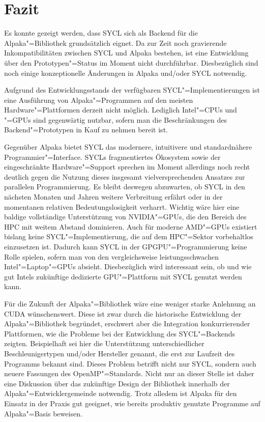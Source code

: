 \chapter{Fazit}
\label{fazit}

Es konnte gezeigt werden, dass SYCL sich als Backend für die Alpaka"=Bibliothek
grundsätzlich eignet. Da zur Zeit noch gravierende Inkompatibilitäten zwischen
SYCL und Alpaka bestehen, ist eine Entwicklung über den Prototypen"=Status
im Moment nicht durchführbar. Diesbezüglich sind noch einige konzeptionelle
Änderungen in Alpaka und/oder SYCL notwendig.

Aufgrund des Entwicklungsstands der verfügbaren SYCL"=Implementierungen ist eine
Ausführung von Alpaka"=Programmen auf den meisten Hardware"=Plattformen derzeit
nicht möglich. Lediglich Intel"=CPUs und "=GPUs sind gegenwärtig nutzbar, sofern
man die Beschränkungen des Backend"=Prototypen in Kauf zu nehmen bereit ist.

Gegenüber Alpaka bietet SYCL das modernere, intuitivere und standardnähere
Programmier"=Interface. SYCLs fragmentiertes Ökosystem sowie der eingeschränkte
Hardware"=Support sprechen im Moment allerdings noch recht deutlich gegen die
Nutzung dieses insgesamt vielversprechenden Ansatzes zur parallelen Programmierung. Es
bleibt deswegen abzuwarten, ob SYCL in den nächsten Monaten und Jahren weitere
Verbreitung erfährt oder in der momentanen relativen Bedeutungslosigkeit
verharrt. Wichtig wäre hier eine baldige vollständige Unterstützung von
NVIDIA"=GPUs, die den Bereich des HPC mit weitem Abstand dominieren. Auch für
moderne AMD"=GPUs existiert bislang keine SYCL"=Implementierung, die auf dem
HPC"=Sektor vorbehaltlos einzusetzen ist. Dadurch kann SYCL in der
GPGPU"=Programmierung keine Rolle spielen, sofern man von den vergleichsweise
leistungsschwachen Intel"=Laptop"=GPUs absieht. Diesbezüglich wird interessant
sein, ob und wie gut Intels zukünftige dedizierte GPU"=Plattform mit SYCL
genutzt werden kann.

Für die Zukunft der Alpaka"=Bibliothek wäre eine weniger starke Anlehnung an
CUDA wünschenswert. Diese ist zwar durch die historische Entwicklung der
Alpaka"=Bibliothek begründet, erschwert aber die Integration konkurrierender
Plattformen, wie die Probleme bei der Entwicklung des SYCL"=Backends zeigten.
Beispielhaft sei hier die Unterstützung unterschiedlicher Beschleunigertypen
und/oder Hersteller genannt, die erst zur Laufzeit des Programms bekannt sind.
Dieses Problem betrifft nicht nur SYCL, sondern auch neuere Fassungen des
OpenMP"=Standards. Nicht nur an dieser Stelle ist daher eine Diskussion über das
zukünftige Design der Bibliothek innerhalb der Alpaka"=Entwicklergemeinde
notwendig. Trotz alledem ist Alpaka für den Einsatz in der Praxis gut geeignet,
wie bereits produktiv genutzte Programme auf Alpaka"=Basis beweisen.

